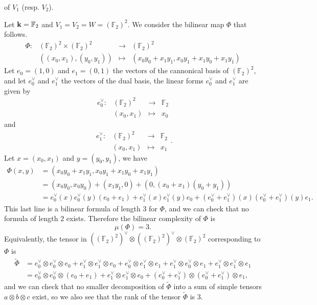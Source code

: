 of $V_1$ (resp. $V_2$).
\begin{ex}
  \label{ex:bilinear-complexity}
  Let $\mathbf{k}=\mathbb{F}_2$ and $V_1=V_2=W=(\mathbb{F}_2)^2$. We consider the
  bilinear map $\Phi$ that follows.
\[
\begin{array}{llcl}
  \Phi:&(\mathbb{F}_2)^2\times (\mathbb{F}_{2})^2&\to&(\mathbb{F}_2)^2\\
  &((x_0, x_1), (y_0, y_1))&\mapsto&(x_0y_0+x_1y_1, x_0y_1+x_1y_0+x_1y_1)
\end{array}
\]
Let $e_0=(1,0)$ and $e_1=(0,1)$ the vectors of the cannonical basis of
$(\mathbb{F}_{2})^2$, and let $e_0^\vee$ and $e_1^\vee$ the vectors of the dual
basis, \ie the linear forms $e_0^\vee$ and $e_1^\vee$ are given by
\[
\begin{array}{llcl}
  e_0^\vee:&(\mathbb{F}_2)^2&\to&\mathbb{F}_2\\
  &(x_0, x_1)&\mapsto&x_0
\end{array}
\]
and
\[
\begin{array}{llcl}
  e_1^\vee:&(\mathbb{F}_2)^2&\to&\mathbb{F}_2\\
  &(x_0, x_1)&\mapsto&x_1
\end{array}.
\]
Let $x = (x_0, x_1)$ and $y = (y_0, y_1)$, we have 
\begin{align*}
  \Phi(x,y) &= (x_0y_0+x_1y_1, x_0y_1+x_1y_0+x_1y_1) \\
  &= (x_0y_0, x_0y_0)+(x_1y_1, 0)+(0, (x_0+x_1)(y_0+y_1)) \\
  &=
  e_0^\vee(x)e_0^\vee(y)(e_0+e_1)+e_1^\vee(x)e_1^\vee(y)e_0+(e_0^\vee+e_1^\vee)(x)(e_0^\vee+e_1^\vee)(y)e_1.
\end{align*}
This last line is a bilinear formula of length $3$ for $\Phi$, and we can check
that no formula of length $2$ exists. Therefore the bilinear complexity of
$\Phi$ is 
\[
  \mu(\Phi) = 3.
\]
Equivalently, the tensor in
$((\mathbb{F}_2)^2)^\vee\otimes((\mathbb{F}_2)^2)^\vee\otimes(\mathbb{F}_2)^2$
corresponding to $\Phi$ is
\begin{align*}
  \widetilde{\Phi} &= e_0^\vee\otimes e_0^\vee\otimes e_0 + e_1^\vee\otimes
  e_1^\vee\otimes e_0 + e_0^\vee\otimes e_1^\vee\otimes e_1 + e_1^\vee\otimes
  e_0^\vee\otimes e_1 + e_1^\vee\otimes e_1^\vee\otimes e_1 \\
  &= e_0^\vee\otimes e_0^\vee\otimes(e_0+e_1)+e_1^\vee\otimes
  e_1^\vee\otimes e_0+(e_0^\vee+e_1^\vee)\otimes (e_0^\vee+e_1^\vee)\otimes e_1,
\end{align*}
and we can check that no smaller decomposition of $\widetilde\Phi$ into a sum of simple
tensors $a\otimes b\otimes c$ exist,
so we also see that the rank of the tensor $\widetilde\Phi$ is $3$.
\end{ex}
